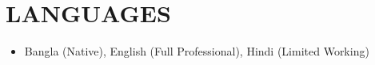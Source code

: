 \documentclass[11pt,letterpaper]{article}
\begin{document}
\vspace{1em}
\section{LANGUAGES}

\vspace{0.5em}
\begin{itemize}[leftmargin=*,nosep]
  \item Bangla (Native), English (Full Professional), Hindi (Limited Working)
\end{itemize}
\end{document}
